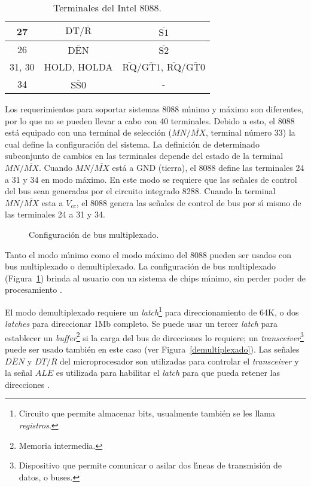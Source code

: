 \begin{table}[!htb]
\begin{tabular}{|c|c|c|}
27 & $\mbox{DT}/\overline{\mbox{R}}$ & $\overline{\mbox{S1}}$ \\ \hline

26 & $\overline{\mbox{DEN}}$ & $\overline{\mbox{S2}}$ \\ \hline

31, 30 & HOLD, HOLDA & $\overline{\mbox{RQ}}/\overline{\mbox{GT1}}$,  %
$\overline{\mbox{RQ}}/\overline{\mbox{GT0}}$ \\ \hline

34 & $\overline{\mbox{SS0}}$ & - \\ \hline
\end{tabular}
\caption{Terminales del Intel 8088.}
\label{Tabla:8088pines}
\end{table}

Los requerimientos para soportar sistemas 8088 m\'{\i}nimo y m\'aximo son diferentes, por lo %
que no se pueden llevar a cabo con 40 terminales. Debido a esto, el 8088 est\'a equipado con una %
terminal de selecci\'on ($MN/\overline{MX}$, terminal n\'umero 33) la cual define la %
configuraci\'on del sistema. La definici\'on de determinado subconjunto de cambios en las %
terminales depende del estado de la terminal $MN/\overline{MX}$. Cuando $MN/\overline{MX}$ %
est\'a a GND (tierra), el 8088 define las terminales 24 a 31 y 34 en modo m\'aximo. En este %
modo se requiere que las se\~nales de control del bus sean generadas por el circuito integrado %
8288. Cuando la terminal $MN/\overline{MX}$ esta a $V_{cc}$, el 8088 genera las se\~nales de %
control de bus por s\'{\i} mismo de las terminales 24 a 31 y 34.

\begin{figure}[!hbt]
\vskip 15mm
\vskip 110mm
\caption{Configuraci\'on de bus multiplexado.} 
\label{multiplexado}
\end{figure}

Tanto el modo m\'{\i}nimo como el modo m\'aximo del 8088 pueden ser usados con bus %
multiplexado o demultiplexado. La configuraci\'on de bus multiplexado %
(Figura~\ref{multiplexado}) brinda al usuario con un sistema de chips m\'{\i}nimo, sin perder %
poder de procesamiento \cite{Intel:Micro}.

El modo demultiplexado requiere un {\em latch}\footnote{Circuito que permite almacenar bits, %
usualmente tambi\'en se les llama {\it registros\/}.} para direccionamiento de 64K, o dos %
{\em latches} para direccionar 1Mb completo. Se puede usar un tercer {\em latch} para %
establecer un {\em buffer}\footnote{Memoria intermedia.} si la carga del bus de direcciones %
lo requiere; un {\em transceiver}\footnote{Dispositivo que permite comunicar o asilar dos %
l\'{\i}neas de transmisi\'on de datos, o buses.} puede ser usado tambi\'en en este caso (ver %
Figura~\ref{demultiplexado}). Las se\~nales $\overline{DEN}$ y $DT/\overline{R}$ del %
microprocesador son utilizadas para controlar el {\em transceiver} y la se\~nal $ALE$ es %
utilizada para habilitar el {\em latch\/} para que pueda retener las direcciones %
\cite{Intel:Micro}.

